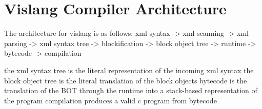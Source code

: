 \section{Vislang Compiler Architecture}

The architecture for vislang is as follows:
xml syntax -> xml scanning -> xml parsing -> xml syntax tree 
  -> blockification -> block object tree 
  -> runtime -> bytecode 
  -> compilation

the xml syntax tree is the literal representation of the incoming xml syntax
the block object tree is the literal translation of the block objects
bytecode is the translation of the BOT through the runtime into a stack-based representation of the program
compilation produces a valid c program from bytecode
